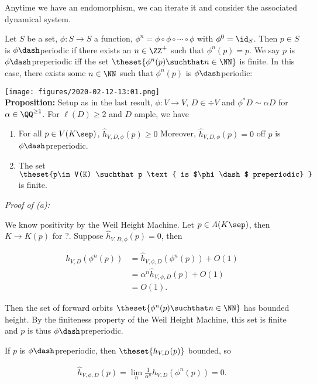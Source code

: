 Anytime we have an endomorphism, we can iterate it and consider the
associated dynamical system.

Let \(S\) be a set, \(\phi: S\to S\) a function,
\(\phi^n = \phi \circ \phi \circ \cdots \circ \phi\) with
\(\phi^0 = \id_S\). Then \(p\in S\) is \(\phi\dash\)periodic if there
exists an \(n\in \ZZ^+\) such that \(\phi^n(p) = p\). We say \(p\) is
\(\phi\dash\)preperiodic iff the set
\(\theset{\phi^n(p) \suchthat n\in \NN}\) is finite. In this case, there
exists some \(n\in \NN\) such that \(\phi^n(p)\) is
\(\phi\dash\)periodic:

\texttt{[image: figures/2020-02-12-13:01.png]}\\

\textbf{Proposition:} Setup as in the last result, \(\phi: V\to V\),
\(D\in \div V\) and \(\phi^*D \sim \alpha D\) for
\(\alpha \in \QQ^{\geq 1}\). For \(\ell(D) \geq 2\) and \(D\) ample, we
have

\begin{enumerate}
\def\labelenumi{\alph{enumi}.}
\item
  For all \(p\in V(K\sep)\), \(\hat h_{V, D, \phi}(p) \geq 0\) Moreover,
  \(\hat h_{V, D, \phi}(p) = 0\) off \(p\) is \(\phi\dash\)preperiodic.
\item
  The set
  \(\theset{p\in V(K) \suchthat p \text{ is $\phi\dash$ preperiodic} }\)
  is finite.
\end{enumerate}

\emph{Proof of (a):}

We know positivity by the Weil Height Machine. Let \(p\in A(K\sep)\),
then \(K \to K(p)\) for ?. Suppose \(\hat h_{V, D, \phi}(p) = 0\), then

\begin{align*}
h_{V, D}( \phi^n(p)  ) 
&= \hat h_{V, \phi, D}(\phi^n(p)) + O(1) \\
&= \alpha^n \hat h_{V, \phi, D}(p) + O(1) \\
&= O(1)
.\end{align*}

Then the set of forward orbits \(\theset{\phi^n(p) \suchthat n\in \NN}\)
has bounded height. By the finiteness property of the Weil Height
Machine, this set is finite and \(p\) is thus \(\phi\dash\)preperiodic.

If \(p\) is \(\phi\dash\)preperiodic, then \(\theset{h_{V, D}(p)}\)
bounded, so

\begin{align*}
\hat h_{V, \phi, D} (p) = \lim_n \frac{1}{\alpha^n} h_{V, D}(\phi^n(p)) = 0
.\end{align*}


